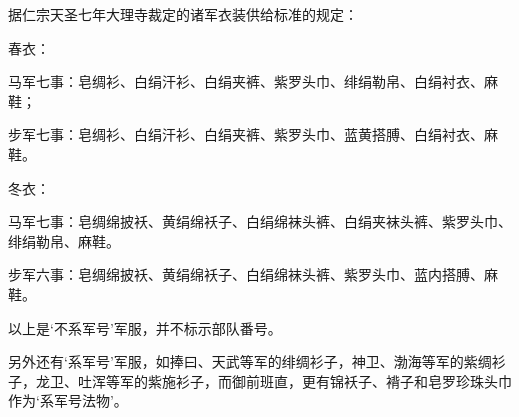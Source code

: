 据仁宗天圣七年大理寺裁定的诸军衣装供给标准的规定：

春衣：

马军七事：皂绸衫、白绢汗衫、白绢夹裤、紫罗头巾、绯绢勒帛、白绢衬衣、麻鞋；

步军七事：皂绸衫、白绢汗衫、白绢夹裤、紫罗头巾、蓝黄搭膊、白绢衬衣、麻鞋。

冬衣：

马军七事：皂绸绵披袄、黄绢绵袄子、白绢绵袜头裤、白绢夹袜头裤、紫罗头巾、绯绢勒帛、麻鞋。

步军六事：皂绸绵披袄、黄绢绵袄子、白绢绵袜头裤、紫罗头巾、蓝内搭膊、麻鞋。

以上是‘不系军号’军服，并不标示部队番号。

另外还有‘系军号’军服，如捧曰、天武等军的绯绸衫子，神卫、渤海等军的紫绸衫子，龙卫、吐浑等军的紫施衫子，而御前班直，更有锦袄子、褙子和皂罗珍珠头巾作为‘系军号法物’。

